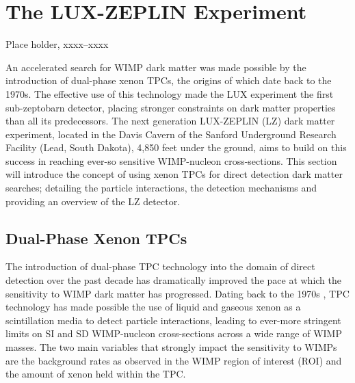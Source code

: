 \chapter{The LUX-ZEPLIN Experiment}
\label{chap:chap2}

%
{Place holder, xxxx--xxxx}%


An accelerated search for WIMP dark matter was made possible by the introduction of dual-phase xenon TPCs, the origins of which date back to the 1970s. The effective use of this technology made the LUX experiment the first sub-zeptobarn detector, placing stronger constraints on dark matter properties than all its predecessors. The next generation LUX-ZEPLIN (LZ) dark matter experiment, located in the Davis Cavern of the Sanford Underground Research Facility (Lead, South Dakota), 4,850 feet under the ground, aims to build on this success in reaching ever-so sensitive WIMP-nucleon cross-sections. This section will introduce the concept of using xenon TPCs for direct detection dark matter searches; detailing the particle interactions, the detection mechanisms and providing an overview of the LZ detector.


\section{Dual-Phase Xenon TPCs}
\label{sec:dualphaseTPC}

The introduction of dual-phase TPC technology into the domain of direct detection over the past decade has dramatically improved the pace at which the sensitivity to WIMP dark matter has progressed. Dating back to the 1970s \cite{tpc_technology}, TPC technology has made possible the use of liquid and gaseous xenon as a scintillation media to detect particle interactions, leading to ever-more stringent limits on SI and SD WIMP-nucleon cross-sections across a wide range of WIMP masses. The two main variables that strongly impact the sensitivity to WIMPs are the background rates as observed in the WIMP region of interest (ROI) and the amount of xenon held within the TPC.

